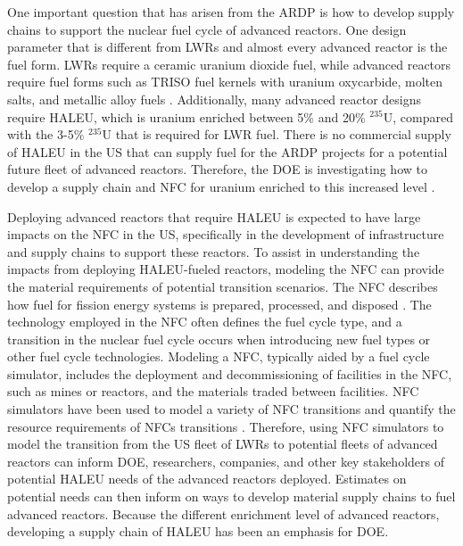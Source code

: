 One important question that has arisen from the \gls{ARDP} is how to
develop supply chains to support the nuclear fuel cycle of 
advanced reactors. One design parameter that is different from \glspl{LWR} 
and almost every advanced reactor is the fuel form. \glspl{LWR} require 
a ceramic uranium dioxide fuel, while advanced reactors require fuel 
forms such as \gls{TRISO} fuel kernels with uranium oxycarbide, molten 
salts, and metallic alloy fuels \cite{hussain_advances_2018}.
Additionally, many advanced reactor designs require  
\acrfull{HALEU}, which is uranium enriched between 5\% and 20\% $^{235}$U,
compared with the 3-5\% $^{235}$U that is required for \gls{LWR} 
fuel. There is no commercial supply of \gls{HALEU} in the US that can 
supply fuel for the \gls{ARDP} projects for a potential future fleet of 
advanced reactors. Therefore, the \gls{DOE} is investigating how to develop 
a supply chain and \gls{NFC} for uranium enriched to this 
increased level \cite{dixon_estimated_2022}. 

Deploying advanced reactors that require \gls{HALEU} is expected to have 
large impacts on the \gls{NFC} in the US, specifically in the development 
of infrastructure and supply chains to support these reactors. To assist 
in understanding the impacts 
from deploying \gls{HALEU}-fueled reactors, modeling the \gls{NFC} 
can provide the material requirements of potential transition scenarios. 
The \gls{NFC} describes how fuel for fission energy systems is 
prepared, processed, and disposed \cite{tsoulfanidis_nuclear_2013}. 
The technology employed in the \gls{NFC} often defines the fuel 
cycle type, 
and a transition in the nuclear fuel cycle occurs when 
introducing new fuel types or other fuel cycle technologies.  
Modeling  a \gls{NFC}, typically aided by a fuel cycle simulator, 
includes the deployment and decommissioning of facilities in the \gls{NFC}, 
such as mines or reactors, and the materials traded between facilities. 
\gls{NFC} simulators have been used to model a variety of \gls{NFC} 
transitions \cite{sunny_transition_2015,bae_fuel_2018,piet_dynamic_2011} 
and quantify the resource requirements of \glspl{NFC} transitions
\cite{bachmann_enrichment_2021}. Therefore, using \gls{NFC} simulators to 
model the transition from the US fleet of \glspl{LWR} to potential 
fleets of advanced reactors can inform \gls{DOE}, researchers, companies, 
and other key stakeholders of potential \gls{HALEU} needs of the 
advanced reactors deployed. Estimates on potential needs can then inform on 
ways to develop material supply chains to fuel advanced reactors. Because 
the different enrichment level of advanced reactors, developing a supply 
chain of \gls{HALEU} has been an emphasis for \gls{DOE}. 

